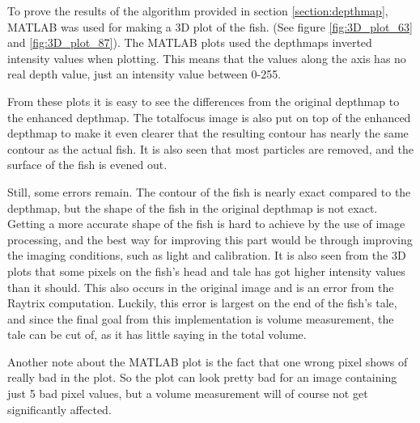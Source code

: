 To prove the results of the algorithm provided in section \ref{section:depthmap}, MATLAB was used for making a 3D plot of the fish. (See figure \ref{fig:3D_plot_63} and \ref{fig:3D_plot_87}). The MATLAB plots used the depthmaps inverted intensity values when plotting. This means that the values along the axis has no real depth value, just an intensity value between 0-255.\cite{website:mathworks_meshgrid}

From these plots it is easy to see the differences from the original depthmap to the enhanced depthmap. The totalfocus image is also put on top of the enhanced depthmap to make it even clearer that the resulting contour has nearly the same contour as the actual fish. It is also seen that most particles are removed, and the surface of the fish is evened out.

Still, some errors remain. The contour of the fish is nearly exact compared to the depthmap, but the shape of the fish in the original depthmap is not exact. Getting a more accurate shape of the fish is hard to achieve by the use of image processing, and the best way for improving this part would be through improving the imaging conditions, such as light and calibration. 
It is also seen from the 3D plots that some pixels on the fish's head and tale has got higher intensity values than it should.
This also occurs in the original image and is an error from the Raytrix computation. Luckily, this error is largest on the end of the fish's tale, and since the final goal from this implementation is volume measurement, the tale can be cut of, as it has little saying in the total volume. 

Another note about the MATLAB plot is the fact that one wrong pixel shows of really bad in the plot. So the plot can look pretty bad for an image containing just 5 bad pixel values, but a volume measurement will of course not get significantly affected.


